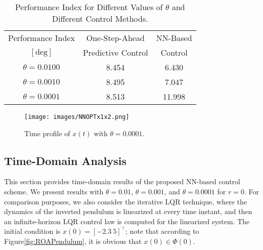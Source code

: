 \documentclass[1p,times]{elsarticle}
\begin{document}


\begin{table}[!t]
    \centering
    \caption{Performance Index for Different Values of $\theta$ and Different Control Methods.}
    \begin{tabular}{c|c|c}
    \hline
     Performance Index & One-Step-Ahead  & NN-Based \\  $[\text{deg}]$ & Predictive Control & Control \\
       \hline\hline
     ${\theta=0.0100}$ & 8.454 & 6.430 \\
       \hline   
     ${\theta=0.0010}$ & 8.495 & 7.047 \\
       \hline  
     ${\theta=0.0001}$ & 8.513 & 11.998\\
       \hline  


       \end{tabular}
\label{tab:thetas}
\end{table}


\begin{figure}[!t]
    \centering
    \texttt{[image: images/NNOPTx1x2.png]}
    \caption{{{\color{blue}}Time profile of $x(t)$ with ${\theta}=0.0001$.}}
    \label{fig:NNOPTx1x2}
\end{figure}



\subsection{Time-Domain Analysis}
This section provides time-domain results of the proposed NN-based control scheme. We present results with $\theta=0.01$, $\theta=0.001$, and $\theta=0.0001$ for $r=0$. {{\color{blue}}For comparison purposes, we also consider the iterative LQR technique, where the dynamics of the inverted pendulum is linearized at every time instant, and then an infinite-horizon LQR control law is computed for the linearized system.}  The initial condition is $x(0)=[-2.3~5]^\top${{\color{blue}}; note that according to Figure\ref{fig:ROAPendulum}, it is obvious that $x(0)\in\Phi(0)$.}
\end{document}
